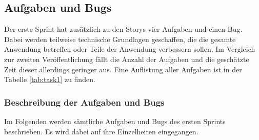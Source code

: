 \subsection{Aufgaben und Bugs}
Der erste Sprint hat zusätzlich zu den Storys vier Aufgaben und einen Bug. Dabei werden teilweise technische Grundlagen geschaffen, die die gesamte Anwendung betreffen oder Teile der Anwendung verbessern sollen. Im Vergleich zur zweiten Veröffentlichung fällt die Anzahl der Aufgaben und die geschätzte Zeit dieser allerdings geringer aus. Eine Auflistung aller Aufgaben ist in der Tabelle \ref{tab:task1} zu finden.

\subsubsection{Beschreibung der Aufgaben und Bugs}
Im Folgenden werden sämtliche Aufgaben und Bugs des ersten Sprints beschrieben. Es wird dabei auf ihre Einzelheiten eingegangen.

